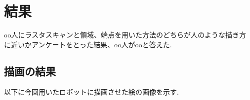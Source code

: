 \chapter{結果}
  \label{chap:result}
  oo人にラスタスキャンと領域、端点を用いた方法のどちらが人のような描き方に近いかアンケートをとった結果、oo人がooと答えた.
  \section{描画の結果}
  \label{sec:drawing result}
  以下に今回用いたロボットに描画させた絵の画像を示す.

